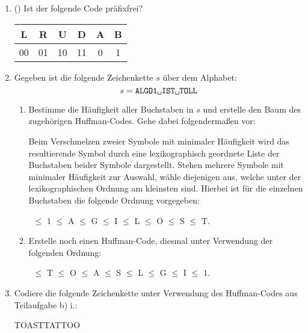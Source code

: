 \documentclass{uebung_cs}
\begin{document}
\begin{aufgabe}\phantom{.}
    \begin{enumerate}
        \item (\warmup) Ist der folgende Code präfixfrei?
        \begin{center}
            { \ttfamily
            \begin{tabular}{c|c|c|c|c|c}
                L & R & U & D & A & B \\ \hline
                00 & 01 & 10 & 11 & 0 & 1 
            \end{tabular}
            }
        \end{center}
        \item Gegeben ist die folgende Zeichenkette $s$ über dem Alphabet:
        $$
            s = \texttt{ALGO1\textvisiblespace IST\textvisiblespace TOLL}
        $$
        \begin{enumerate}
            \item[i.] Bestimme die Häufigkeit aller Buchstaben in $s$ und erstelle den Baum des zugehörigen Huffman-Codes. Gehe dabei folgendermaßen vor:
            
            Beim Verschmelzen zweier Symbole mit minimaler Häufigkeit wird das resultierende Symbol durch eine lexikographisch geordnete Liste der Buchstaben beider Symbole dargestellt. Stehen mehrere Symbole mit minimaler Häufigkeit zur Auswahl, wähle diejenigen aus, welche unter der lexikographischen Ordnung am kleinsten sind. Hierbei ist für die einzelnen Buchstaben die folgende Ordnung vorgegeben:
            \begin{center}
                {\ttfamily \textvisiblespace\ $\leq$ 1 $\leq$ A $\leq$ G $\leq$ I $\leq$ L $\leq$ O $\leq$ S $\leq$ T}.
            \end{center}
            \item[ii.] Erstelle noch einen Huffman-Code, diesmal unter Verwendung der folgenden Ordnung:
            \begin{center}
                {\ttfamily \textvisiblespace\ $\leq$ T $\leq$ O $\leq$ A $\leq$ S $\leq$ L $\leq$ G $\leq$ I $\leq$ 1}.
            \end{center}
        \end{enumerate}
        \item Codiere die folgende Zeichenkette unter Verwendung des Huffman-Codes aus Teilaufgabe b) i.:
        \begin{center}
            \textvisiblespace TOAST\textvisiblespace TATTOO
        \end{center}
    \end{enumerate}
\end{aufgabe}
\end{document}
